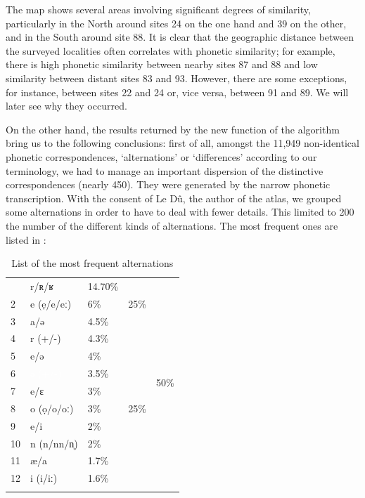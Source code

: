 \documentclass[output=paper]{LSP/langsci}
\begin{document}
The map shows several areas involving significant degrees of similarity, particularly in the North around sites 24 on the one hand and 39 on the other, and in the South around site 88. It is clear that the geographic distance between the surveyed localities often correlates with phonetic similarity; for example, there is high phonetic similarity between nearby sites 87 and 88 and low similarity between distant sites 83 and 93. However, there are some exceptions, for instance, between sites 22 and 24 or, vice versa, between 91 and 89. We will later see why they occurred.

On the other hand, the results returned by the new function of the algorithm bring us to the following conclusions: first of all, amongst the 11,949 non-identical phonetic correspondences, ‘alternations’ or ‘differences’ according to our terminology, we had to manage an important dispersion of the distinctive correspondences (nearly 450). They were generated by the narrow phonetic transcription. With the consent of Le Dû, the author of the atlas, we grouped some alternations in order to have to deal with fewer details. This limited to 200 the number of the different kinds of alternations. The most frequent ones are listed in :

\begin{table}
\begin{tabular}{lllll}
\lsptoprule
 1 & {r/ʀ/ʁ} & 14.70\% & \multirow{3}{*}{25\%} & \multirow{12}{*}{50\%}\\
 2 & \cellcolor{gray!50}e (ẹ/e/eː) & 6\% &  & \\
 3 & a/ə & 4.5\% &  & \\
 \hhline{~~~-~}
 4 & r (+/-) & 4.3\% & \multirow{9}{*}{25\%} & \\
 5 & \cellcolor{gray!25}e/ə & 4\% &  & \\
 6 & \cellcolor{black!100}\textcolor{white}{ə (+/-)} & 3.5\% &  & \\
 7 & e/ɛ & 3\% &  & \\
 8 & o (ọ/o/oː) & 3\% &  & \\
 9 & e/i & 2\% &  & \\
 10 & n (n/nn/n̩) & 2\% &  & \\
 11 & æ/a & 1.7\% &  & \\
 12 & i (i/iː) & 1.6\% &  & \\
\lspbottomrule
\end{tabular}
\caption{List of the most frequent alternations}
\label{tab:4}
\end{table}
\end{document}
